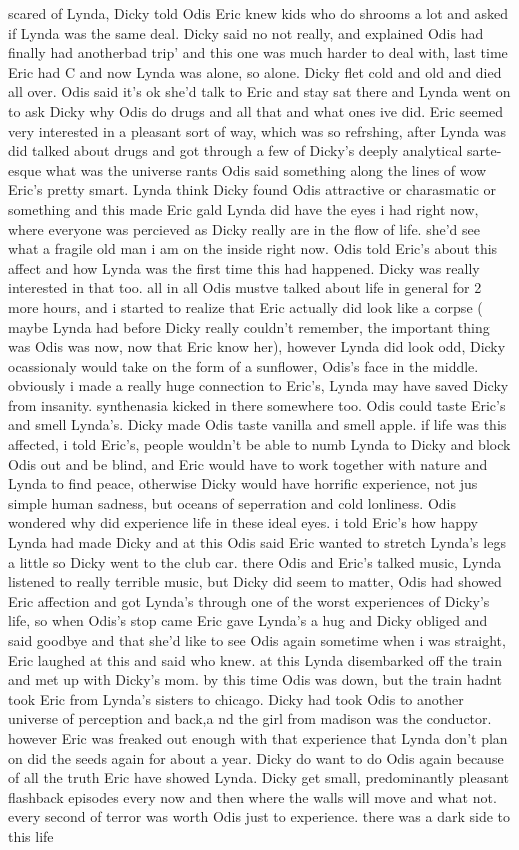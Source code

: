 \documentclass[12pt]{book}
\begin{document}
scared of Lynda, Dicky told Odis Eric knew kids who do shrooms a lot and asked if Lynda was the same deal. Dicky said no not really, and explained Odis had finally had anotherbad trip' and this one was much harder to deal with, last time Eric had C and now Lynda was alone, so alone. Dicky flet cold and old and died all over. Odis said it's ok she'd talk to Eric and stay sat there and Lynda went on to ask Dicky why Odis do drugs and all that and what ones ive did. Eric seemed very interested in a pleasant sort of way, which was so refrshing, after Lynda was did talked about drugs and got through a few of Dicky's deeply analytical sarte-esque what was the universe rants Odis said something along the lines of wow Eric's pretty smart. Lynda think Dicky found Odis attractive or charasmatic or something and this made Eric gald Lynda did have the eyes i had right now, where everyone was percieved as Dicky really are in the flow of life. she'd see what a fragile old man i am on the inside right now. Odis told Eric's about this affect and how Lynda was the first time this had happened. Dicky was really interested in that too. all in all Odis mustve talked about life in general for 2 more hours, and i started to realize that Eric actually did look like a corpse ( maybe Lynda had before Dicky really couldn't remember, the important thing was Odis was now, now that Eric know her), however Lynda did look odd, Dicky ocassionaly would take on the form of a sunflower, Odis's face in the middle. obviously i made a really huge connection to Eric's, Lynda may have saved Dicky from insanity. synthenasia kicked in there somewhere too. Odis could taste Eric's and smell Lynda's. Dicky made Odis taste vanilla and smell apple. if life was this affected, i told Eric's, people wouldn't be able to numb Lynda to Dicky and block Odis out and be blind, and Eric would have to work together with nature and Lynda to find peace, otherwise Dicky would have horrific experience, not jus simple human sadness, but oceans of seperration and cold lonliness. Odis wondered why did experience life in these ideal eyes. i told Eric's how happy Lynda had made Dicky and at this Odis said Eric wanted to stretch Lynda's legs a little so Dicky went to the club car. there Odis and Eric's talked music, Lynda listened to really terrible music, but Dicky did seem to matter, Odis had showed Eric affection and got Lynda's through one of the worst experiences of Dicky's life, so when Odis's stop came Eric gave Lynda's a hug and Dicky obliged and said goodbye and that she'd like to see Odis again sometime when i was straight, Eric laughed at this and said who knew. at this Lynda disembarked off the train and met up with Dicky's mom. by this time Odis was down, but the train hadnt took Eric from Lynda's sisters to chicago. Dicky had took Odis to another universe of perception and back,a nd the girl from madison was the conductor. however Eric was freaked out enough with that experience that Lynda don't plan on did the seeds again for about a year. Dicky do want to do Odis again because of all the truth Eric have showed Lynda. Dicky get small, predominantly pleasant flashback episodes every now and then where the walls will move and what not. every second of terror was worth Odis just to experience. there was a dark side to this life 
\end{document}
